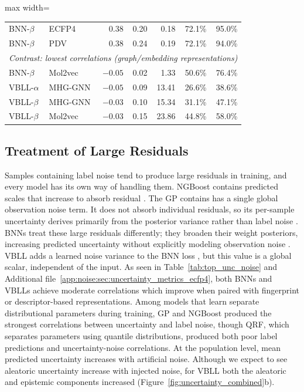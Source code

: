 \begin{table}[htbp]
\begin{adjustbox}{max width=\textwidth}
\begin{tabular}{llrrrrr}
BNN-$\beta$    & ECFP4           & 0.38 & 0.20 & 0.18 & 72.1\% & 95.0\% \\
BNN-$\beta$    & PDV             & 0.38 & 0.24 & 0.19 & 72.1\% & 94.0\% \\
\midrule
\multicolumn{7}{l}{\textit{Contrast: lowest correlations (graph/embedding representations)}} \\
\midrule
BNN-$\beta$ & Mol2vec & $-0.05$ & 0.02 & 1.33 & 50.6\% & 76.4\% \\
VBLL-$\alpha$ & MHG-GNN & $-0.05$ & 0.09 & 13.41 & 26.6\% & 38.6\% \\
VBLL-$\beta$ & MHG-GNN & $-0.03$ & 0.10 & 15.34 & 31.1\% & 47.1\% \\
VBLL-$\beta$ & Mol2vec & $-0.03$ & 0.15 & 23.86 & 44.8\% & 58.0\% \\
\bottomrule
\end{tabular}
\end{adjustbox}
\end{table}

\subsection{Treatment of Large Residuals}

Samples containing label noise tend to produce large residuals in training, and every model has its own way of handling them. NGBoost contains predicted scales that increase to absorb residual \citep{Duan2020}. The GP contains has a single global observation noise term. It does not absorb individual residuals, so its per-sample uncertainty derives primarily from the posterior variance rather than label noise  \citep{Rasmussen2005, Obrezanova2007}. BNNs treat these large residuals differently; they broaden their weight posteriors, increasing predicted uncertainty without explicitly modeling observation noise \citep{gal2016, kendall2017}. VBLL adds a learned noise variance to the BNN loss \citep{Harrison2024}, but this value is a global scalar, independent of the input. As seen in Table~\ref{tab:top_unc_noise} and Additional file~\ref{app:noise:sec:uncertainty_metrics_ecfp4}, both BNNs and VBLLs achieve moderate correlations which improve when paired with fingerprint or descriptor-based representations. Among models that learn separate distributional parameters during training, GP and NGBoost produced the strongest correlations between uncertainty and label noise, though QRF, which separates parameters using quantile distributions, produced both poor label predictions and uncertainty-noise correlations. At the population level, mean predicted uncertainty increases with artificial noise. Although we expect to see aleatoric uncertainty increase with injected noise, for VBLL both the aleatoric and epistemic components increased (Figure~\ref{fig:uncertainty_combined}b).

